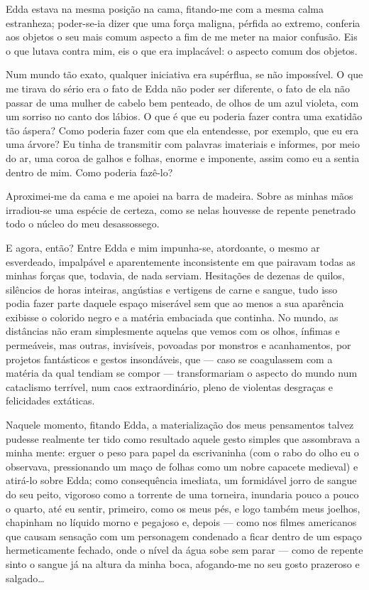 Edda estava na mesma posição na cama, fitando-me com a mesma calma estranheza; poder-se-ia dizer que uma força maligna, pérfida ao extremo, conferia aos objetos o seu mais comum aspecto a fim de me meter na maior confusão. Eis o que lutava contra mim, eis o que era implacável: o aspecto comum dos objetos.

Num mundo tão exato, qualquer iniciativa era supérflua, se não impossível. O que me tirava do sério era o fato de Edda não poder ser diferente, o fato de ela não passar de uma mulher de cabelo bem penteado, de olhos de um azul violeta, com um sorriso no canto dos lábios. O que é que eu poderia fazer contra uma exatidão tão áspera? Como poderia fazer com que ela entendesse, por exemplo, que eu era uma árvore? Eu tinha de transmitir com palavras imateriais e informes, por meio do ar, uma coroa de galhos e folhas, enorme e imponente, assim como eu a sentia dentro de mim. Como poderia fazê-lo?

Aproximei-me da cama e me apoiei na barra de madeira. Sobre as minhas mãos irradiou-se uma espécie de certeza, como se nelas houvesse de repente penetrado todo o núcleo do meu desassossego.

E agora, então? Entre Edda e mim impunha-se, atordoante, o mesmo ar esverdeado, impalpável e aparentemente inconsistente em que pairavam todas as minhas forças que, todavia, de nada serviam. Hesitações de dezenas de quilos, silêncios de horas inteiras, angústias e vertigens de carne e sangue, tudo isso podia fazer parte daquele espaço miserável sem que ao menos a sua aparência exibisse o colorido negro e a matéria embaciada que continha. No mundo, as distâncias não eram simplesmente aquelas que vemos com os olhos, ínfimas e permeáveis, mas outras, invisíveis, povoadas por monstros e acanhamentos, por projetos fantásticos e gestos insondáveis, que --- caso se coagulassem com a matéria da qual tendiam se compor --- transformariam o aspecto do mundo num cataclismo terrível, num caos extraordinário, pleno de violentas desgraças e felicidades extáticas.

Naquele momento, fitando Edda, a materialização dos meus pensamentos talvez pudesse realmente ter tido como resultado aquele gesto simples que assombrava a minha mente: erguer o peso para papel da escrivaninha (com o rabo do olho eu o observava, pressionando um maço de folhas como um nobre capacete medieval) e atirá-lo sobre Edda; como consequência imediata, um formidável jorro de sangue do seu peito, vigoroso como a torrente de uma torneira, inundaria pouco a pouco o quarto, até eu sentir, primeiro, como os meus pés, e logo também meus joelhos, chapinham no líquido morno e pegajoso e, depois --- como nos filmes americanos que causam sensação com um personagem condenado a ficar dentro de um espaço hermeticamente fechado, onde o nível da água sobe sem parar --- como de repente sinto o sangue já na altura da minha boca, afogando-me no seu gosto prazeroso e salgado\dots

